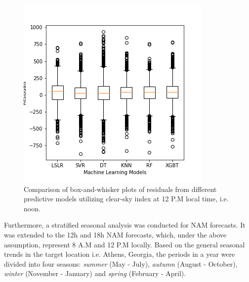 \begin{figure}[ht]
    \begin{center}
    	\includegraphics[scale=0.75]{chapter4/fig_whiskers_csi.png}
    	\caption[Comparison of box-and-whisker plots of residuals from different predictive models utilizing clear-sky index at 12 P.M local time]{Comparison of box-and-whisker plots of residuals from different predictive models utilizing clear-sky index at 12 P.M local time, i.e. noon.}
    	\label{fig:fig_noon_whisker}
    \end{center}
\end{figure}

\par Furthermore, a stratified seasonal analysis was conducted for NAM forecasts. It was extended to the 12h and 18h NAM forecasts, which, under the above assumption, represent 8 A.M and 12 P.M locally. Based on the general seasonal trends in the target location i.e. Athens, Georgia, the periods in a year were divided into four seasons: \textit{summer} (May - July), \textit{autumn} (August - October), \textit{winter} (November - January) and \textit{spring} (February - April).

